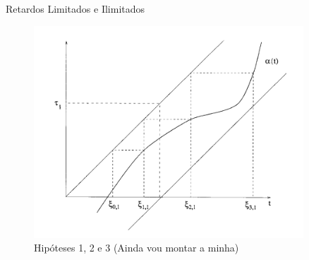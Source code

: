 \documentclass{beamer}
\theoremstyle{plain}
\theoremstyle{definition}
\begin{document}
\begin{frame}{Retardos Limitados e Ilimitados}

    \begin{figure}
        \begin{center}
            \includegraphics[width=0.9\textwidth, height=0.7\textheight]{hip123.png}
        \end{center}
        \caption{Hipóteses 1, 2 e 3 (Ainda vou montar a minha)}\label{fig:hip123}
    \end{figure}

\end{frame}


\end{document}
